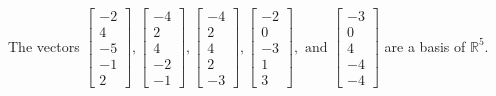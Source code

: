 \begin{exercise}
\begin{exerciseStatement}
  \end{exerciseStatement}
  \begin{exerciseAnswer}
   The vectors \(\left[\begin{array}{r}
-2 \\
4 \\
-5 \\
-1 \\
2
\end{array}\right] , \left[\begin{array}{r}
-4 \\
2 \\
4 \\
-2 \\
-1
\end{array}\right] , \left[\begin{array}{r}
-4 \\
2 \\
4 \\
2 \\
-3
\end{array}\right] , \left[\begin{array}{r}
-2 \\
0 \\
-3 \\
1 \\
3
\end{array}\right] , \text{ and } \left[\begin{array}{r}
-3 \\
0 \\
4 \\
-4 \\
-4
\end{array}\right]\) 
  	 are  a basis of \(\mathbb{R}^5\).
  


  \end{exerciseAnswer}
\end{exercise}